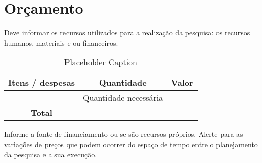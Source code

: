 

\chapter{Orçamento}

Deve informar os recursos utilizados para a realização da pesquisa: os recursos humanos, materiais e ou financeiros.

\begin{table}[h]
    \centering
    \begin{tabular}{|c|c|c|}
        \hline
        \textbf{Itens / despesas} & \textbf{Quantidade} & \textbf{Valor} \\ \hline
        & \multirow{2}{*}{Quantidade necessária} & \\ \cline{1-1} \cline{3-3}
        & 01 & \\ \hline
        \textbf{Total} & & \\ \hline
    \end{tabular}
    \caption{Placeholder Caption}
    \label{tab:placeholder_label}
\end{table}

Informe a fonte de financiamento ou se são recursos próprios. Alerte para as variações de preços que podem ocorrer do espaço de tempo entre o planejamento da pesquisa e a sua execução.

